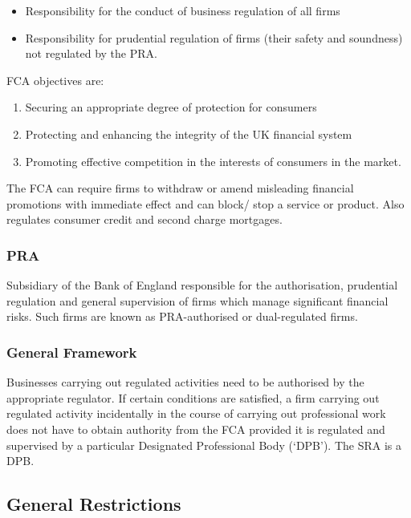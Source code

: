 \documentclass[
]{article}
\providecommand{\tightlist}{%
  \setlength{\itemsep}{0pt}\setlength{\parskip}{0pt}}
\begin{document}
\begin{itemize}
\tightlist
\item
  Responsibility for the conduct of business regulation of all firms
\item
  Responsibility for prudential regulation of firms (their safety and
  soundness) not regulated by the PRA.
\end{itemize}

FCA objectives are:

\begin{enumerate}
\def\labelenumi{\arabic{enumi}.}
\tightlist
\item
  Securing an appropriate degree of protection for consumers
\item
  Protecting and enhancing the integrity of the UK financial system
\item
  Promoting effective competition in the interests of consumers in the
  market.
\end{enumerate}

The FCA can require firms to withdraw or amend misleading financial
promotions with immediate effect and can block/ stop a service or
product. Also regulates consumer credit and second charge mortgages.

\hypertarget{pra}{%
\subsubsection{PRA}\label{pra}}

Subsidiary of the Bank of England responsible for the authorisation,
prudential regulation and general supervision of firms which manage
significant financial risks. Such firms are known as PRA-authorised or
dual-regulated firms.

\hypertarget{general-framework}{%
\subsubsection{General Framework}\label{general-framework}}

Businesses carrying out regulated activities need to be authorised by
the appropriate regulator. If certain conditions are satisfied, a firm
carrying out regulated activity incidentally in the course of carrying
out professional work does not have to obtain authority from the FCA
provided it is regulated and supervised by a particular Designated
Professional Body (`DPB'). The SRA is a DPB.

\hypertarget{general-restrictions}{%
\subsection{General Restrictions}\label{general-restrictions}}
\end{document}
